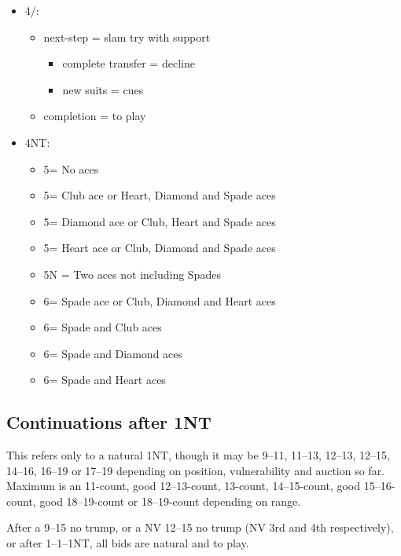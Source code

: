 \documentclass[a4paper,14pt]{extarticle}
\begin{document}
\begin{itemize}
\newpage

\item 4\clubs/\diamonds:
	\begin{itemize}
	\item next-step = slam try with support
		\begin{itemize}
		\item complete transfer = decline
		\item new suits = cues
		\end{itemize}
	\item completion = to play
	\end{itemize}

\item 4NT:
	\begin{itemize}
	\item 5\clubs = No aces
	\item 5\diamonds = Club ace or Heart, Diamond and Spade aces
	\item 5\hearts = Diamond ace or Club, Heart and Spade aces
	\item 5\spades = Heart ace or Club, Diamond and Spade aces
	\item 5N = Two aces not including Spades
	\item 6\clubs = Spade ace or Club, Diamond and Heart aces
	\item 6\diamonds = Spade and Club aces
	\item 6\hearts = Spade and Diamond aces
	\item 6\spades = Spade and Heart aces
	\end{itemize}

\end{itemize}

\newpage

\subsection{Continuations after 1NT}
\label{sec:resp:1n}


This refers only to a natural 1NT, though it may be 9--11, 11--13, 12--13,
12--15, 14--16, 16--19 or 17--19 depending on position, vulnerability and
auction so far.  Maximum is an 11-count, good 12--13-count, 13-count,
14--15-count, good 15--16-count, good 18--19-count or 18--19-count depending on
range.

After a 9--15 no trump, or a NV 12--15 no trump (NV 3rd and 4th respectively),
or after 1\clubs--1\diamonds--1NT, all bids are natural and to play.
\end{document}
